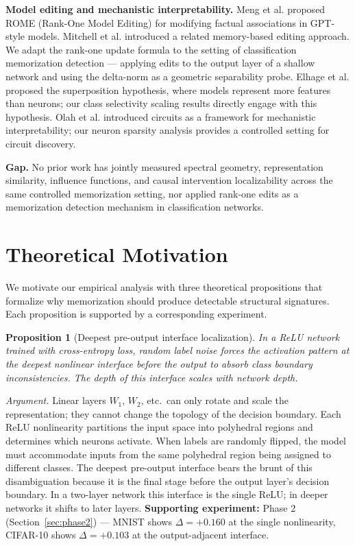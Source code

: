 \documentclass{article}
\newtheorem{proposition}{Proposition}
\begin{document}
\textbf{Model editing and mechanistic interpretability.} Meng et al. \cite{meng2022locating} proposed ROME (Rank-One Model Editing) for modifying factual associations in GPT-style models. Mitchell et al. \cite{mitchell2022memory} introduced a related memory-based editing approach. We adapt the rank-one update formula to the setting of classification memorization detection — applying edits to the output layer of a shallow network and using the delta-norm as a geometric separability probe. Elhage et al. \cite{elhage2022toy} proposed the superposition hypothesis, where models represent more features than neurons; our class selectivity scaling results directly engage with this hypothesis. Olah et al. \cite{olah2020zoom} introduced circuits as a framework for mechanistic interpretability; our neuron sparsity analysis provides a controlled setting for circuit discovery.

\textbf{Gap.} No prior work has jointly measured spectral geometry, representation similarity, influence functions, and causal intervention localizability across the same controlled memorization setting, nor applied rank-one edits as a memorization detection mechanism in classification networks.

\section{Theoretical Motivation}
\label{sec:theory}

We motivate our empirical analysis with three theoretical propositions that formalize why memorization should produce detectable structural signatures. Each proposition is supported by a corresponding experiment.

\begin{proposition}[Deepest pre-output interface localization]
\label{prop:nonlinearity}
In a ReLU network trained with cross-entropy loss, random label noise forces the activation pattern at the deepest nonlinear interface before the output to absorb class boundary inconsistencies. The depth of this interface scales with network depth.
\end{proposition}

\textit{Argument.} Linear layers $W_1$, $W_2$, etc.\ can only rotate and scale the representation; they cannot change the topology of the decision boundary. Each ReLU nonlinearity partitions the input space into polyhedral regions and determines which neurons activate. When labels are randomly flipped, the model must accommodate inputs from the same polyhedral region being assigned to different classes. The deepest pre-output interface bears the brunt of this disambiguation because it is the final stage before the output layer's decision boundary. In a two-layer network this interface is the single ReLU; in deeper networks it shifts to later layers. \textbf{Supporting experiment:} Phase 2 (Section~\ref{sec:phase2}) — MNIST shows $\Delta=+0.160$ at the single nonlinearity, CIFAR-10 shows $\Delta=+0.103$ at the output-adjacent interface.
\end{document}
